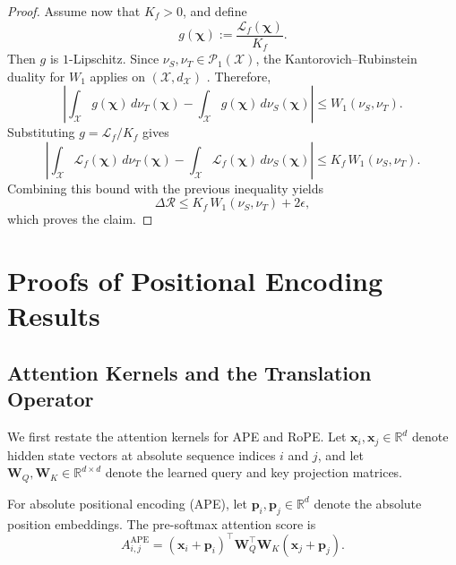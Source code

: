 \begin{proof}
Assume now that $K_f>0$, and define
\begin{equation}
g(\boldsymbol{\chi}) := \frac{\mathcal{L}_f(\boldsymbol{\chi})}{K_f}.
\end{equation}
Then $g$ is $1$-Lipschitz. Since $\nu_S,\nu_T\in\mathcal{P}_1(\mathcal X)$, the Kantorovich--Rubinstein duality for $W_1$ applies on $(\mathcal X,d_{\mathcal X})$ \citep{Villani2009,weed2019sharp}. Therefore,
\begin{equation}
\left|
\int_{\mathcal{X}} g(\boldsymbol{\chi})\,d\nu_T(\boldsymbol{\chi})
-
\int_{\mathcal{X}} g(\boldsymbol{\chi})\,d\nu_S(\boldsymbol{\chi})
\right|
\le
W_1(\nu_S,\nu_T).
\end{equation}
Substituting $g=\mathcal{L}_f/K_f$ gives
\begin{equation}
\left|
\int_{\mathcal{X}} \mathcal{L}_f(\boldsymbol{\chi})\,d\nu_T(\boldsymbol{\chi})
-
\int_{\mathcal{X}} \mathcal{L}_f(\boldsymbol{\chi})\,d\nu_S(\boldsymbol{\chi})
\right|
\le
K_f\,W_1(\nu_S,\nu_T).
\end{equation}
Combining this bound with the previous inequality yields
\begin{equation}
\Delta \mathcal{R}
\le
K_f\,W_1(\nu_S,\nu_T)+2\epsilon,
\end{equation}
which proves the claim.
\end{proof}

\section{Proofs of Positional Encoding Results}
\label{app:pe-results}

\subsection{Attention Kernels and the Translation Operator}
\label{app:attention-translation}

We first restate the attention kernels for APE and RoPE. Let $\mathbf{x}_i,\mathbf{x}_j \in \mathbb{R}^d$ denote hidden state vectors at absolute sequence indices $i$ and $j$, and let $\mathbf{W}_Q,\mathbf{W}_K \in \mathbb{R}^{d\times d}$ denote the learned query and key projection matrices.

For absolute positional encoding (APE), let $\mathbf{p}_i,\mathbf{p}_j \in \mathbb{R}^d$ denote the absolute position embeddings. The pre-softmax attention score is
\begin{equation}
A_{i,j}^{\mathrm{APE}}
=
(\mathbf{x}_i+\mathbf{p}_i)^\top
\mathbf{W}_Q^\top \mathbf{W}_K
(\mathbf{x}_j+\mathbf{p}_j).
\end{equation}

